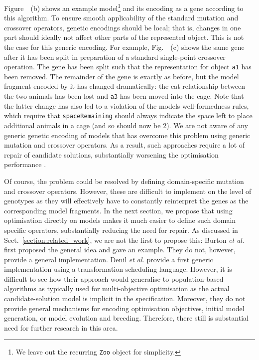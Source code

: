 	
	Figure~~(b) shows an example model\footnote{We leave out the recurring \texttt{Zoo} object for simplicity.} and its encoding as a gene
	according to this algorithm. To ensure smooth applicability of the standard mutation and crossover operators, genetic encodings should be local; that is, changes
	in one part should ideally not affect other parts of the represented object. This is not the case for this generic encoding. For example, 
	Fig.~~(c) shows the same gene after it has been split in preparation of a standard single-point crossover operation. The gene has been split
	such that the representation for object \texttt{a1} has been removed. The remainder of the gene is exactly as before, but the model fragment encoded by it has
	changed dramatically: the eat relationship between the two animals has been lost and \texttt{a3} has been moved into the cage. Note that the latter change has
	also led to a violation of the models well-formedness rules, which require that \texttt{spaceRemaining} should always indicate the space left to place additional
	animals in a cage (and so should now be 2). We are not aware of any generic genetic encoding of models that has overcome this problem using generic mutation and
	crossover operators. As a result, such approaches require a lot of repair of candidate solutions, substantially worsening the optimisation performance 
	\cite{Efstathiou+14b}.
	
	Of course, the problem could be resolved by defining domain-specific mutation and crossover operators. However, these are difficult to implement on the level of
	genotypes as they will effectively have to constantly reinterpret the genes as the corresponding model fragments. In the next section, we propose that using
	optimisation directly on models makes it much easier to define such domain specific operators, substantially reducing the need for repair. As discussed in 
	Sect.~\ref{section:related_work}, we are not the first to propose this: Burton \emph{et al.} \cite{Burton+12,BurtonPoulding13} first proposed the general idea
	and gave an example. They do not, however, provide a general implementation. Denil \emph{et al.} \cite{Denil+14} provide a first generic implementation using a
	transformation scheduling language. However, it is difficult to see how their approach would generalise to population-based algorithms as typically used for 
	multi-objective optimisation as the actual candidate-solution model is implicit in the specification. Moreover, they do not provide general mechanisms for
	encoding optimisation objectives, initial model generation, or model evolution and breeding. Therefore, there still is substantial need for further research in
	this area.